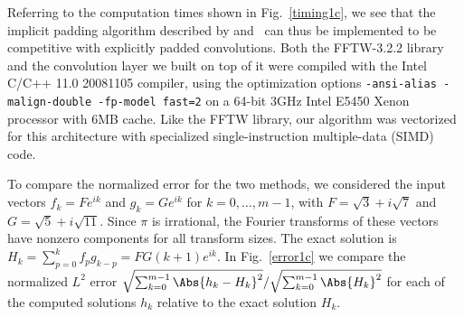 \documentclass[final]{siamltex}
\begin{document}
Referring to the computation times shown in Fig.~\ref{timing1c},
we see that the implicit padding algorithm described by  
and~
can thus be implemented to be competitive with explicitly padded
convolutions. Both the FFTW-3.2.2 library and the convolution layer we built on
top of it were compiled with the Intel C/C++ 11.0 20081105 compiler, using
the optimization options {\tt -ansi-alias -malign-double -fp-model fast=2}
on a 64-bit 3GHz Intel E5450 Xenon processor with 6MB cache. Like the FFTW
library, our algorithm was vectorized for this architecture with
specialized single-instruction multiple-data (SIMD) code.

To compare the normalized error for the two methods, we considered the
input vectors $f_k=F e^{ik}$ and $g_k=G e^{ik}$ for $k=0,\ldots,m-1$,
with $F=\sqrt3+ i\sqrt 7$ and $G=\sqrt5+ i\sqrt {11}$.
Since $\pi$ is irrational, the Fourier transforms of these vectors have
nonzero components for all transform sizes.
The exact solution is $H_k=\sum_{p=0}^k f_p g_{k-p}=FG (k+1) e^{ik}$.
In Fig.~\ref{error1c} we compare the normalized $L^2$ error 
$\sqrt{\sum_{k=0}^{m-1}\Abs{h_k-H_k}^2}/\sqrt{\sum_{k=0}^{m-1} \Abs{H_k}^2}$
for each of the computed solutions $h_k$ relative to the exact solution $H_k$.

\SetProcFnt{\textnormal}
\setlength{\algomargin}{0.6em}
\SetAlCapSkip{3pt}
\def\ProcNameFnt{\tt}

\def\fft{{\tt fft}}
\def\crfft{{\tt crfft}}
\def\rcfft{{\tt rcfft}}
\def\cconv{{\tt cconv}}
\def\conv{{\tt conv}}
\def\biconv{{\tt biconv}}
\def\build{{\tt build}}
\def\fftpadBackwards{{\tt fftpadBackwards}}
\def\fftpadForwards{{\tt fftpadForwards}}
\def\fftOpadBackwards{{\tt fft0padBackwards}}
\def\fftOpadForwards{{\tt fft0padForwards}}
\def\fftbipadBackwards{{\tt fftbipadBackwards}}
\def\fftbipadForwards{{\tt fftbipadForwards}}
\def\fftObipadBackwards{{\tt fft0bipadBackwards}}
\def\fftObipadForwards{{\tt fft0bipadForwards}}
\end{document}
